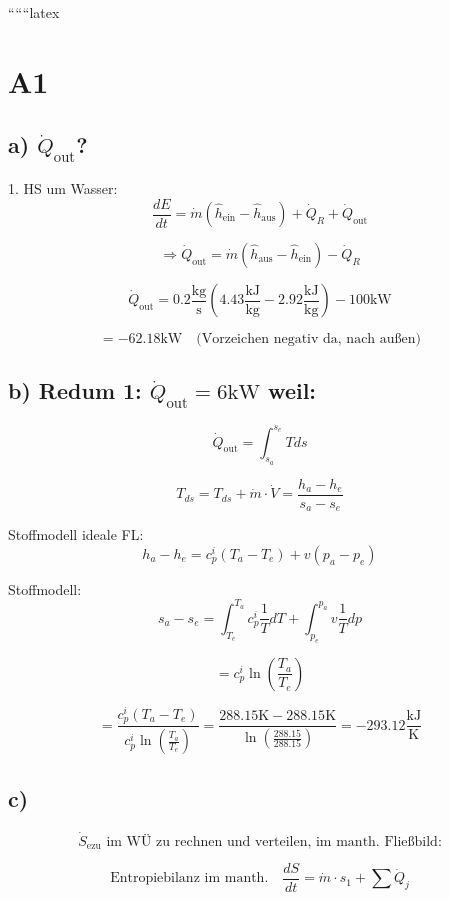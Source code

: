 
``````latex


\section*{A1}

\subsection*{a) $\dot{Q}_{\text{out}}$?}

1. HS um Wasser:
\[
\frac{dE}{dt} = \dot{m} (\hat{h}_{\text{ein}} - \hat{h}_{\text{aus}}) + \dot{Q}_R + \dot{Q}_{\text{out}}
\]

\[
\Rightarrow \dot{Q}_{\text{out}} = \dot{m} (\hat{h}_{\text{aus}} - \hat{h}_{\text{ein}}) - \dot{Q}_R
\]

\[
\dot{Q}_{\text{out}} = 0.2 \frac{\text{kg}}{\text{s}} (4.43 \frac{\text{kJ}}{\text{kg}} - 2.92 \frac{\text{kJ}}{\text{kg}}) - 100 \text{kW}
\]

\[
= -62.18 \text{kW} \quad \text{(Vorzeichen negativ da, nach außen)}
\]

\subsection*{b) Redum 1: $\dot{Q}_{\text{out}} = 6 \text{kW}$ weil:}

\[
\dot{Q}_{\text{out}} = \int_{s_a}^{s_e} T ds
\]

\[
T_{ds} = T_{ds} + \dot{m} \cdot \dot{V} = \frac{h_a - h_e}{s_a - s_e}
\]

Stoffmodell ideale FL:
\[
h_a - h_e = c_p^i (T_a - T_e) + v (p_a - p_e)
\]

Stoffmodell:
\[
s_a - s_e = \int_{T_e}^{T_a} c_p^i \frac{1}{T} dT + \int_{p_e}^{p_a} v \frac{1}{T} dp
\]

\[
= c_p^i \ln \left( \frac{T_a}{T_e} \right)
\]

\[
= \frac{c_p^i (T_a - T_e)}{c_p^i \ln \left( \frac{T_a}{T_e} \right)} = \frac{288.15 \text{K} - 288.15 \text{K}}{\ln \left( \frac{288.15}{288.15} \right)} = -293.12 \frac{\text{kJ}}{\text{K}}
\]

\subsection*{c)}

\[
\dot{S}_{\text{ezu}} \text{ im WÜ zu rechnen und verteilen, im manth. Fließbild:}
\]

\[
\text{Entropiebilanz im manth.} \quad \frac{dS}{dt} = \dot{m} \cdot s_1 + \sum \dot{Q}_j
\]

